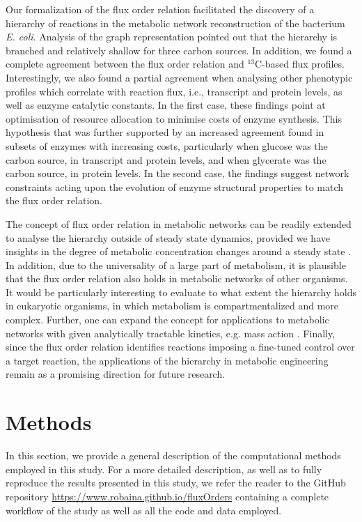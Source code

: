 \documentclass[12pt]{article}
\begin{document}
Our formalization of the flux order relation facilitated the discovery of a hierarchy of reactions in the metabolic network reconstruction of the bacterium \emph{E. coli}. Analysis of the graph representation pointed out that the hierarchy is branched and relatively shallow for three carbon sources. In addition, we found a complete agreement between the flux order relation and ${}^{13}\mathrm{C}$-based flux profiles.  Interestingly, we also found a partial agreement when analysing other phenotypic profiles which correlate with reaction flux, i.e., transcript and protein levels, as well as enzyme catalytic constants. In the first case, these findings point at optimisation of resource allocation to minimise costs of enzyme synthesis. This hypothesis that was further supported by an increased agreement found in subsets of enzymes with increasing costs, particularly when glucose was the carbon source, in transcript and protein levels, and when glycerate was the carbon source, in protein levels. In the second case, the findings suggest network constraints acting upon the evolution of enzyme structural properties to match the flux order relation.

The concept of flux order relation in metabolic networks can be readily extended to analyse the hierarchy outside of steady state dynamics, provided we have insights in the degree of metabolic concentration changes around a steady state \cite{Kleessen2015,Bordbar2017}. In addition, due to the universality of a large part of metabolism, it is plausible that the flux order relation also holds in metabolic networks of other organisms. It would be particularly interesting to evaluate to what extent the hierarchy holds in eukaryotic organisms, in which metabolism is compartmentalized and more complex. Further, one can expand the concept for applications to metabolic networks with given analytically tractable kinetics, e.g. mass action \cite{Kuken2019}. Finally, since the flux order relation identifies reactions imposing a fine-tuned control over a target reaction, the applications of the hierarchy in metabolic engineering remain as a promising direction for future research.

\section{Methods}
\label{section: Methods}
In this section, we provide a general description of the computational methods employed in this study. For a more detailed description, as well as to fully reproduce the results presented in this study, we refer the reader to the GitHub repository \url{https://www.robaina.github.io/fluxOrders} containing a complete workflow of the study as well as all the code and data employed.
\end{document}
